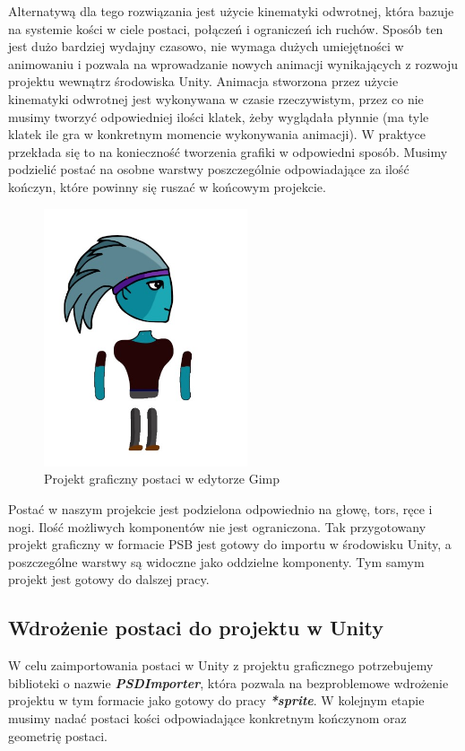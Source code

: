 \documentclass[oneside,polski,logo]{amuthesis}
\begin{document}
Alternatywą dla tego rozwiązania jest użycie kinematyki odwrotnej, która bazuje na systemie kości w ciele postaci, połączeń i ograniczeń ich ruchów. Sposób ten jest dużo bardziej wydajny czasowo, nie wymaga dużych umiejętności w animowaniu i pozwala na wprowadzanie nowych animacji wynikających z rozwoju projektu wewnątrz środowiska Unity. Animacja stworzona przez użycie kinematyki odwrotnej jest wykonywana w czasie rzeczywistym, przez co nie musimy tworzyć odpowiedniej ilości klatek, żeby wyglądała płynnie (ma tyle klatek ile gra w konkretnym momencie wykonywania animacji).
W praktyce przekłada się to na konieczność tworzenia grafiki w odpowiedni sposób. Musimy podzielić postać na osobne warstwy poszczególnie odpowiadające za ilość kończyn, które powinny się ruszać w końcowym projekcie.\\

\begin{figure}[h]
	\centering
	\includegraphics[width=6cm]{images/kozubal/separatedCharacter.jpg}
	\caption{Projekt graficzny postaci w edytorze Gimp}
\end{figure}

Postać w naszym projekcie jest podzielona odpowiednio na głowę, tors, ręce i nogi. Ilość możliwych komponentów nie jest ograniczona. Tak przygotowany projekt graficzny w formacie PSB jest gotowy do importu w środowisku Unity, a poszczególne warstwy są widoczne jako oddzielne komponenty. Tym samym projekt jest gotowy do dalszej pracy.
\subsection{Wdrożenie postaci do projektu w Unity}
W celu zaimportowania postaci w Unity z projektu graficznego potrzebujemy biblioteki o nazwie \textbf{\textit{PSDImporter}}, która pozwala na bezproblemowe wdrożenie projektu w tym formacie jako gotowy do pracy \textbf{\textit{*sprite}}. W kolejnym etapie musimy nadać postaci kości odpowiadające konkretnym kończynom oraz geometrię postaci.
\end{document}
